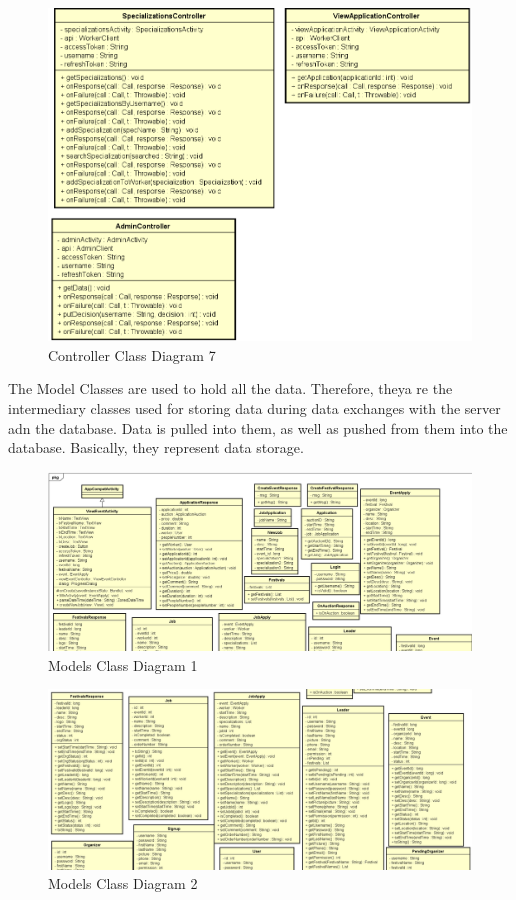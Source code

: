 \begin{figure}[H]
	\includegraphics[width=\linewidth]{diagrams/Controllers Class Diagram_part7.png}
	\caption{Controller Class Diagram 7}
	\label{fig:controller_class_diag_pt7}
\end{figure}

The Model Classes are used to hold all the data. Therefore, theya re the intermediary classes used for storing data during data exchanges with the server adn the database. Data is pulled into them, as well as pushed from them into the database. Basically, they represent data storage.

\begin{figure}[H]
	\includegraphics[width=\linewidth]{diagrams/Models Class Diagram_1.png}
	\caption{Models Class Diagram 1}
	\label{fig:models_class_diag_1}
\end{figure}

\begin{figure}[H]
	\includegraphics[width=\linewidth]{diagrams/Models Class Diagram_2.png}
	\caption{Models Class Diagram 2}
	\label{fig:models_class_diag_2}
\end{figure}

